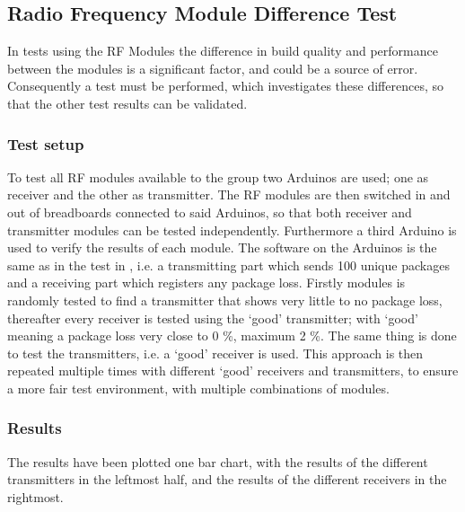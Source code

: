 \subsection{Radio Frequency Module Difference Test} %
\label{cha:radio_frequency_module_difference_test}
In tests using the RF Modules the difference in build quality and performance between the modules is a significant factor, and could be a source of error.
Consequently a test must be performed, which investigates these differences, so that the other test results can be validated.

\subsubsection*{Test setup}
To test all RF modules available to the group two Arduinos are used; one as receiver and the other as transmitter.
The RF modules are then switched in and out of breadboards connected to said Arduinos, so that both receiver and transmitter modules can be tested independently.
Furthermore a third Arduino is used to verify the results of each module.
The software on the Arduinos is the same as in the test in , i.e. a transmitting part which sends 100 unique packages and a receiving part which registers any package loss. 
Firstly modules is randomly tested to find a transmitter that shows very little to no package loss, thereafter every receiver is tested using the \enquote*{good} transmitter; with \enquote*{good} meaning a package loss very close to 0 \%, maximum 2 \%.
The same thing is done to test the transmitters, i.e. a \enquote*{good} receiver is used.
This approach is then repeated multiple times with different \enquote*{good} receivers and transmitters, to ensure a more fair test environment, with multiple combinations of modules.

\subsubsection*{Results}
The results have been plotted one bar chart, with the results of the different transmitters in the leftmost half, and the results of the different receivers in the rightmost.

